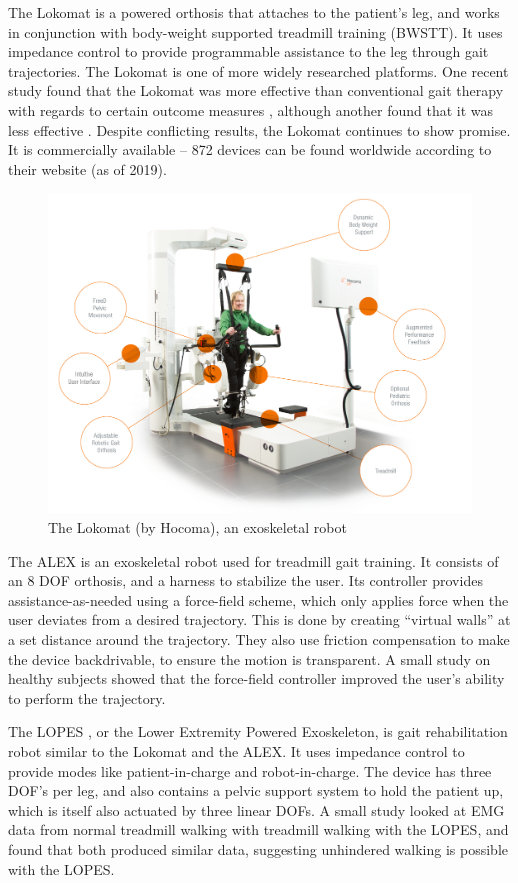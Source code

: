 \documentclass[12pt]{report}
\begin{document}
	The Lokomat is a powered orthosis that attaches to the patient's leg, and works in conjunction with body-weight supported treadmill training (BWSTT). It uses impedance control to provide programmable assistance to the leg through gait trajectories. The Lokomat is one of more widely researched platforms. One recent study found that the Lokomat was more effective than conventional gait therapy with regards to certain outcome measures \cite{Nam2017}, although another found that it was less effective \cite{Hidler2008}. Despite conflicting results, the Lokomat continues to show promise. It is commercially available -- 872 devices can be found worldwide according to their website (as of 2019).
			
	\begin{figure}[h] 
		\centering
		\includegraphics[width=0.75\linewidth]{Lokomat}
		\caption{The Lokomat (by Hocoma), an exoskeletal robot}
		\label{fig:Lokomat}
	\end{figure}
	
	The ALEX \cite{Banala2007} is an exoskeletal robot used for treadmill gait training. It consists of an 8 DOF orthosis, and a harness to stabilize the user. Its controller provides assistance-as-needed using a force-field scheme, which only applies force when the user deviates from a desired trajectory. This is done by creating ``virtual walls'' at a set distance around the trajectory. They also use friction compensation to make the device backdrivable, to ensure the motion is transparent. A small study on healthy subjects showed that the force-field controller improved the user's ability to perform the trajectory. 
	
	The LOPES \cite{Veneman2007}, or the Lower Extremity Powered Exoskeleton, is gait rehabilitation robot similar to the Lokomat and the ALEX. It uses impedance control to provide modes like patient-in-charge and robot-in-charge. The device has three DOF's per leg, and also contains a pelvic support system to hold the patient up, which is itself also actuated by three linear DOFs. A small study looked at EMG data from normal treadmill walking with treadmill walking with the LOPES, and found that both produced similar data, suggesting unhindered walking is possible with the LOPES.
	
\end{document}
